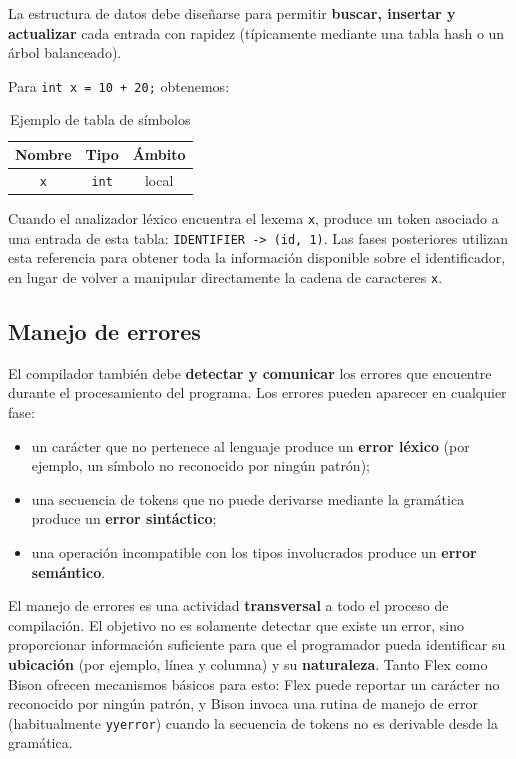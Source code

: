 \documentclass[11pt,a4paper]{article}
\begin{document}
La estructura de datos debe diseñarse para permitir \textbf{buscar, insertar y actualizar} cada
entrada con rapidez (típicamente mediante una tabla hash o un árbol balanceado).

Para \texttt{int x = 10 + 20;} obtenemos:

\begin{table}[H]
\centering
\begin{tabular}{ccc}
\toprule
\textbf{Nombre} & \textbf{Tipo} & \textbf{Ámbito} \\
\midrule
\texttt{x} & \texttt{int} & local \\
\bottomrule
\end{tabular}
\caption{Ejemplo de tabla de símbolos}
\label{tab:symbol-table}
\end{table}

Cuando el analizador léxico encuentra el lexema \texttt{x}, produce un token asociado a una
entrada de esta tabla: \texttt{IDENTIFIER -> (id, 1)}. Las fases posteriores utilizan esta
referencia para obtener toda la información disponible sobre el identificador, en lugar de
volver a manipular directamente la cadena de caracteres \texttt{x}.

\subsection{Manejo de errores}
\label{sec:errores}

El compilador también debe \textbf{detectar y comunicar} los errores que encuentre durante el
procesamiento del programa. Los errores pueden aparecer en cualquier fase:

\begin{itemize}
    \item un carácter que no pertenece al lenguaje produce un \textbf{error léxico} (por
    ejemplo, un símbolo no reconocido por ningún patrón);
    \item una secuencia de tokens que no puede derivarse mediante la gramática produce un
    \textbf{error sintáctico};
    \item una operación incompatible con los tipos involucrados produce un \textbf{error
    semántico}.
\end{itemize}

El manejo de errores es una actividad \textbf{transversal} a todo el proceso de compilación. El
objetivo no es solamente detectar que existe un error, sino proporcionar información suficiente
para que el programador pueda identificar su \textbf{ubicación} (por ejemplo, línea y columna) y
su \textbf{naturaleza}. Tanto Flex como Bison ofrecen mecanismos básicos para esto: Flex puede
reportar un carácter no reconocido por ningún patrón, y Bison invoca una rutina de manejo de
error (habitualmente \texttt{yyerror}) cuando la secuencia de tokens no es derivable desde la
gramática.
\end{document}
